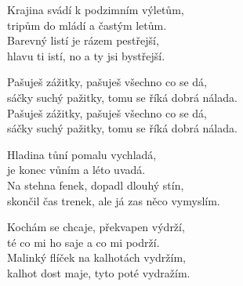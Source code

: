 \ve{}
Krajina svádí k podzimním výletům,\\tripům do mládí a častým letům.\\
Barevný listí je rázem pestřejší,\\
hlavu ti istí, no a ty jsi bystřejší.

\cho{}
Pašuješ zážitky, pašuješ všechno co se dá,\\
sáčky suchý pažitky, tomu se říká dobrá nálada.\\
Pašuješ zážitky, pašuješ všechno co se dá,\\
sáčky suchý pažitky, tomu se říká dobrá nálada.

\ve
Hladina tůní pomalu vychladá,\\
je konec vůním a léto uvadá.\\
Na stehna fenek, dopadl dlouhý stín,\\
skončil čas trenek, ale já zas něco vymyslím.

\cho{}

\ve{}
Kochám se chcaje, překvapen výdrží,\\
té co mi ho saje a co mi podrží.\\
Malinký flíček na kalhotách vydržím,\\
kalhot dost maje, tyto poté vydražím.

\esong{}